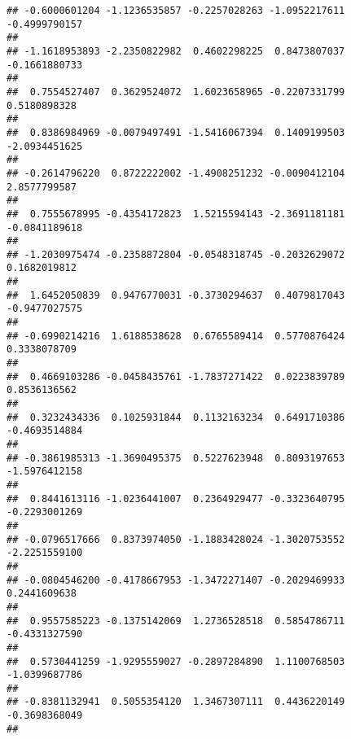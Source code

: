 \documentclass[]{article}
\begin{document}
\begin{verbatim}
## -0.6000601204 -1.1236535857 -0.2257028263 -1.0952217611 -0.4999790157 
##                                                                       
## -1.1618953893 -2.2350822982  0.4602298225  0.8473807037 -0.1661880733 
##                                                                       
##  0.7554527407  0.3629524072  1.6023658965 -0.2207331799  0.5180898328 
##                                                                       
##  0.8386984969 -0.0079497491 -1.5416067394  0.1409199503 -2.0934451625 
##                                                                       
## -0.2614796220  0.8722222002 -1.4908251232 -0.0090412104  2.8577799587 
##                                                                       
##  0.7555678995 -0.4354172823  1.5215594143 -2.3691181181 -0.0841189618 
##                                                                       
## -1.2030975474 -0.2358872804 -0.0548318745 -0.2032629072  0.1682019812 
##                                                                       
##  1.6452050839  0.9476770031 -0.3730294637  0.4079817043 -0.9477027575 
##                                                                       
## -0.6990214216  1.6188538628  0.6765589414  0.5770876424  0.3338078709 
##                                                                       
##  0.4669103286 -0.0458435761 -1.7837271422  0.0223839789  0.8536136562 
##                                                                       
##  0.3232434336  0.1025931844  0.1132163234  0.6491710386 -0.4693514884 
##                                                                       
## -0.3861985313 -1.3690495375  0.5227623948  0.8093197653 -1.5976412158 
##                                                                       
##  0.8441613116 -1.0236441007  0.2364929477 -0.3323640795 -0.2293001269 
##                                                                       
## -0.0796517666  0.8373974050 -1.1883428024 -1.3020753552 -2.2251559100 
##                                                                       
## -0.0804546200 -0.4178667953 -1.3472271407 -0.2029469933  0.2441609638 
##                                                                       
##  0.9557585223 -0.1375142069  1.2736528518  0.5854786711 -0.4331327590 
##                                                                       
##  0.5730441259 -1.9295559027 -0.2897284890  1.1100768503 -1.0399687786 
##                                                                       
## -0.8381132941  0.5055354120  1.3467307111  0.4436220149 -0.3698368049 
##                                                                       

\end{verbatim}
\end{document}
